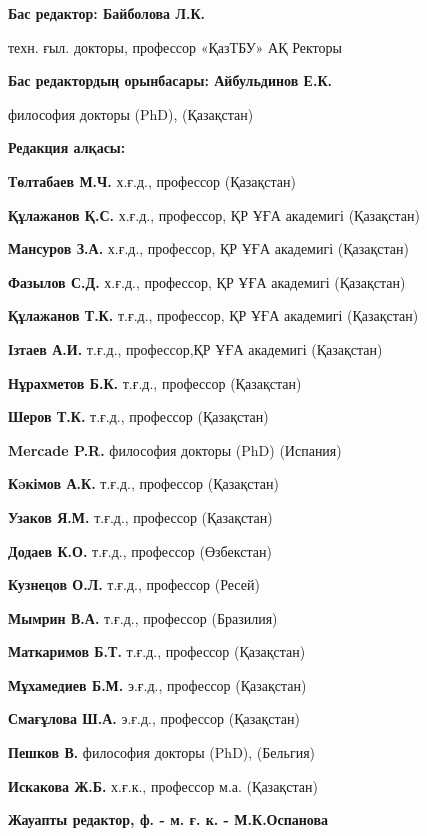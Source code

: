 \pagebreak
{\small
\begin{center}
\textbf{Бас редактор: Байболова Л.К.}

техн. ғыл. докторы, профессор «ҚазТБУ» АҚ Ректоры

\textbf{Бас редактордың орынбасары: Айбульдинов Е.К.} 

философия докторы (PhD), (Қазақстан)

\textbf{Редакция алқасы:}
\end{center}

\textbf{Төлтабаев М.Ч.} х.ғ.д., профессор (Қазақстан)

\textbf{Құлажанов Қ.С.} х.ғ.д., профессор, ҚР ҰҒА академигі (Қазақстан)

\textbf{Мансуров З.А.} х.ғ.д., профессор, ҚР ҰҒА академигі (Қазақстан)

\textbf{Фазылов С.Д.} х.ғ.д., профессор, ҚР ҰҒА академигі (Қазақстан)

\textbf{Құлажанов Т.К.} т.ғ.д., профессор, ҚР ҰҒА академигі (Қазақстан)

\textbf{Ізтаев А.И.} т.ғ.д., профессор,ҚР ҰҒА академигі (Қазақстан)

\textbf{Нұрахметов Б.К.} т.ғ.д., профессор (Қазақстан)

\textbf{Шеров Т.К.} т.ғ.д., профессор (Қазақстан)

\textbf{Mercade P.R.} философия докторы (PhD) (Испания)

\textbf{Кəкімов А.К.} т.ғ.д., профессор (Қазақстан)

\textbf{Узаков Я.М.} т.ғ.д., профессор (Қазақстан)

\textbf{Додаев К.О.} т.ғ.д., профессор (Өзбекстан)

\textbf{Кузнецов О.Л.} т.ғ.д., профессор (Ресей)

\textbf{Мымрин В.А.} т.ғ.д., профессор (Бразилия)

\textbf{Маткаримов Б.Т.} т.ғ.д., профессор (Қазақстан)

\textbf{Мұхамедиев Б.М.} э.ғ.д., профессор (Қазақстан)

\textbf{Смағұлова Ш.А.} э.ғ.д., профессор (Қазақстан)

\textbf{Пешков В.} философия докторы (PhD), (Бельгия)

\textbf{Искакова Ж.Б.} х.ғ.к., профессор м.а. (Қазақстан)

\begin{center}
\textbf{Жауапты редактор, ф. - м. ғ. к. - М.К.Оспанова}
\end{center}

}
